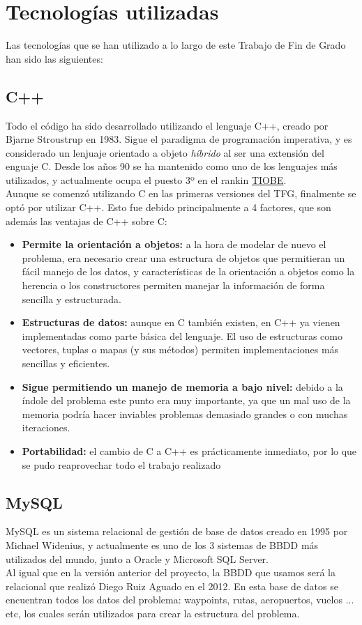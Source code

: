 \chapter{Tecnologías utilizadas}
Las tecnologías que se han utilizado a lo largo de este Trabajo de Fin de Grado han sido las siguientes:

\section{C++}
Todo el código ha sido desarrollado utilizando el lenguaje C++, creado por  Bjarne Stroustrup en 1983. Sigue el paradigma de programación imperativa, y es considerado un lenjuaje orientado a objeto \textit{híbrido} al ser una extensión del enguaje C. Desde los años 90 se ha mantenido como uno de los lenguajes más utilizados, y actualmente ocupa el puesto 3º en el rankin \href{http://www.tiobe.com/tiobe-index/}{TIOBE}.\\

Aunque se comenzó utilizando C en las primeras versiones del TFG, finalmente se optó por utilizar C++. Esto fue debido principalmente a 4 factores, que son además las ventajas de C++ sobre C:
\begin{itemize}
	\item \textbf{Permite la orientación a objetos: }a la hora de modelar de nuevo el problema, era necesario crear una estructura de objetos que permitieran un fácil manejo de los datos, y características de la orientación a objetos como la herencia o los constructores permiten manejar la información de forma sencilla y estructurada.
	\item \textbf{Estructuras de datos: }aunque en C también existen, en C++ ya vienen implementadas como parte básica del lenguaje. El uso de estructuras como vectores, tuplas o mapas (y sus métodos) permiten implementaciones más sencillas y eficientes.
	\item \textbf{Sigue permitiendo un manejo de memoria a bajo nivel: }debido a la índole del problema este punto era muy importante, ya que un mal uso de la memoria podría hacer inviables problemas demasiado grandes o con muchas iteraciones.
	\item \textbf{Portabilidad:} el cambio de C a C++ es prácticamente inmediato, por lo que se pudo reaprovechar todo el trabajo realizado
\end{itemize}
                  

\section{MySQL}
MySQL es un sistema relacional de gestión de base de datos creado en 1995 por Michael Widenius, y actualmente es uno de los 3 sistemas de BBDD más utilizados del mundo, junto a Oracle y Microsoft SQL Server.\\
Al igual que en la versión anterior del proyecto, la BBDD que usamos será la relacional que realizó Diego Ruiz Aguado en el 2012. En esta base de datos se encuentran todos los datos del problema: waypoints, rutas, aeropuertos, vuelos ... etc, los cuales serán utilizados para crear la estructura del problema.


